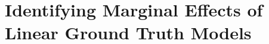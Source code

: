 \documentclass[mnsc,blindrev]{informs3}
\begin{document}
     




\section{Identifying Marginal Effects of Linear Ground Truth Models}
\label{sec:linear_case}
\end{document}
